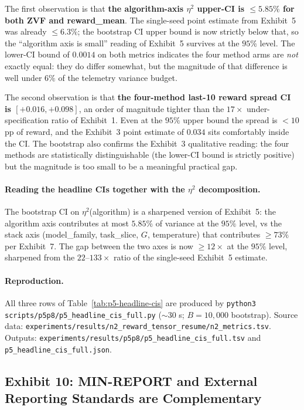 \documentclass{article}  \usepackage[preprint,nonatbib]{neurips_2026} \usepackage[numbers]{natbib}
\providecommand{\tableref}[1]{Table~\ref{#1}}
\begin{document}
The first observation is that \textbf{the algorithm-axis $\eta^{2}$
upper-CI is $\le 5.85\%$ for both ZVF and reward\_mean}. The
single-seed point estimate from Exhibit~5 was already $\le 6.3\%$;
the bootstrap CI upper bound is now strictly below that, so the
``algorithm axis is small'' reading of Exhibit~5 survives at the
$95\%$ level. The lower-CI bound of $0.0014$ on both metrics indicates
the four method arms are \emph{not} exactly equal: they do differ
somewhat, but the magnitude of that difference is well under $6\%$ of
the telemetry variance budget.

The second observation is that \textbf{the four-method last-10 reward
spread CI is $[+0.016, +0.098]$}, an order of magnitude tighter than
the $17{\times}$ under-specification ratio of Exhibit~1. Even at the $95\%$
upper bound the spread is $< 10$ pp of reward, and the Exhibit~3
point estimate of $0.034$ sits comfortably inside the CI. The
bootstrap also confirms the Exhibit~3 qualitative reading: the four
methods are statistically distinguishable (the lower-CI bound is
strictly positive) but the magnitude is too small to be a meaningful
practical gap.

\paragraph{Reading the headline CIs together with the $\eta^{2}$
decomposition.} The bootstrap CI on $\eta^{2}$(algorithm) is a
sharpened version of Exhibit~5: the algorithm axis contributes at
most $5.85\%$ of variance at the $95\%$ level, vs the stack axis
(model\_family, task\_slice, $G$, temperature) that contributes
$\ge 73\%$ per Exhibit~7. The gap between the two axes is now
$\ge 12{\times}$ at the $95\%$ level, sharpened from the $22$--$133{\times}$
ratio of the single-seed Exhibit~5 estimate.

\paragraph{Reproduction.}
All three rows of \tableref{tab:p5-headline-cis} are produced by
\texttt{python3 scripts/p5p8/p5\_headline\_cis\_full.py}
($\sim$30 s; $B{=}10{,}000$ bootstrap). Source data:
\texttt{experiments/results/n2\_reward\_tensor\_resume/n2\_metrics.tsv}.
Outputs: \texttt{experiments/results/p5p8/p5\_headline\_cis\_full.tsv}
and \texttt{p5\_headline\_cis\_full.json}.

\subsection{Exhibit 10: MIN-REPORT and External Reporting Standards are Complementary}
\label{sec:p5-exhibit-external-alignment}
\end{document}

